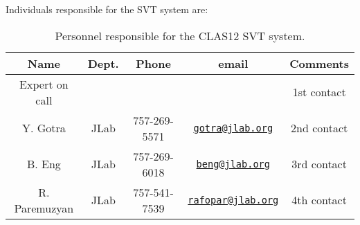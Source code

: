 Individuals responsible for the SVT system are:

\begin{table}[htbp]
\centering
\begin{tabular}{|c|c|c|c|c|} \hline
Name&Dept.&Phone&email&Comments \\ \hline
Expert on call& &&& 1st contact \\ \hline
Y. Gotra& JLab&757-269-5571&\href{mailto:gotra@jlab.org}{\nolinkurl{gotra@jlab.org}}&2nd contact \\ \hline
B. Eng&JLab&757-269-6018&\href{mailto:beng@jlab.org}{\nolinkurl{beng@jlab.org}}&3rd contact \\ \hline
R. Paremuzyan&JLab&757-541-7539&\href{mailto:rafopar@jlab.org}{\nolinkurl{rafopar@jlab.org}}&4th contact \\ \hline
\end{tabular}
\caption{Personnel responsible for the CLAS12 SVT system.} 
\label{tb:svt}
\end{table}


